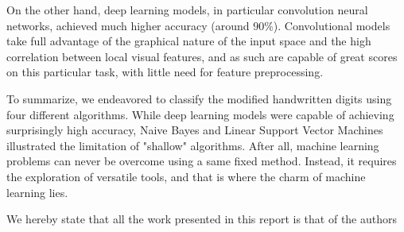 \documentclass{acm_proc_article-sp}
\begin{document}
On the other hand, deep learning models, in particular convolution neural networks, achieved much higher accuracy (around $90 \%$). Convolutional models take full advantage of the graphical nature of the input space and the high correlation between local visual features, and as such are capable of great scores on this particular task, with little need for feature preprocessing.

To summarize, we endeavored to classify the modified handwritten digits using four different algorithms. While deep learning models were capable of  achieving surprisingly high accuracy,  Naive Bayes and Linear Support Vector Machines illustrated the limitation of "shallow" algorithms. After all, machine learning problems can never be overcome using a same fixed method. Instead, it requires the exploration of versatile tools, and that is where the charm of machine learning lies.

\newpage

We	hereby	state	that	all	the	work	 presented	in	this	report	is	that	of	the	authors

  
\end{document}
